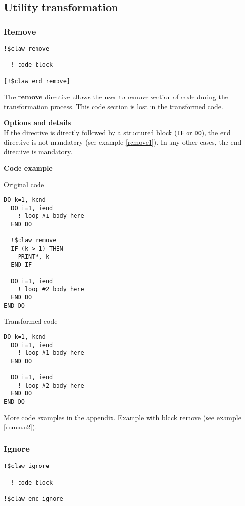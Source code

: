 \subsection{Utility transformation}

\subsubsection{Remove}
\begin{lstlisting}
!$claw remove

  ! code block

[!$claw end remove]
\end{lstlisting}

The \textbf{remove} directive allows the user to remove section of code
during the transformation process. This code section is lost in the
transformed code.

\textbf{Options and details}\\
If the directive is directly followed by a structured block (\lstinline!IF! or
\lstinline!DO!), the end directive is not mandatory (see example
\ref{remove1}). In any other cases, the end directive is mandatory.

\textbf{Code example}
\label{remove1}

Original code
\begin{lstlisting}
DO k=1, kend
  DO i=1, iend
    ! loop #1 body here
  END DO

  !$claw remove
  IF (k > 1) THEN
    PRINT*, k
  END IF

  DO i=1, iend
    ! loop #2 body here
  END DO
END DO
\end{lstlisting}

Transformed code
\begin{lstlisting}
DO k=1, kend
  DO i=1, iend
    ! loop #1 body here
  END DO

  DO i=1, iend
    ! loop #2 body here
  END DO
END DO
\end{lstlisting}

More code examples in the appendix. Example with block remove (see example
\ref{remove2}).


\subsubsection{Ignore}
\begin{lstlisting}
!$claw ignore

  ! code block

!$claw end ignore
\end{lstlisting}

